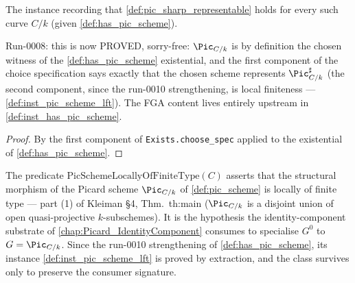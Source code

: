 \begin{definition}
  \label{def:inst_pic_sharp_representable}
  The instance recording that \cref{def:pic_sharp_representable} holds for
  every such curve \(C/k\) (given \cref{def:has_pic_scheme}).

  Run-0008: this is now PROVED, sorry-free: \(\Pic_{C/k}\) is by definition
  the chosen witness of the \cref{def:has_pic_scheme} existential, and the
  first component of the choice specification says exactly that the chosen
  scheme represents \(\Pic^\sharp_{C/k}\) (the second component, since the
  run-0010 strengthening, is local finiteness ---
  \cref{def:inst_pic_scheme_lft}). The FGA content lives entirely upstream
  in \cref{def:inst_has_pic_scheme}.
\end{definition}

\begin{proof}\leanok
  By the first component of \texttt{Exists.choose\_spec} applied to the
  existential of \cref{def:has_pic_scheme}.
\end{proof}


\begin{definition}
  \label{def:pic_scheme_lft}
  The predicate \(\mathrm{PicSchemeLocallyOfFiniteType}(C)\) asserts that the
  structural morphism of the Picard scheme \(\Pic_{C/k}\) of
  \cref{def:pic_scheme} is locally of finite type --- part (1) of Kleiman
  \S 4, Thm.~th:main (\(\Pic_{C/k}\) is a disjoint union of open
  quasi-projective \(k\)-subschemes). It is the hypothesis the
  identity-component substrate of
  \cref{chap:Picard_IdentityComponent} consumes to specialise
  \(G^0\) to \(G = \Pic_{C/k}\). Since the run-0010 strengthening of
  \cref{def:has_pic_scheme}, its instance \cref{def:inst_pic_scheme_lft}
  is proved by extraction, and the class survives only to preserve the
  consumer signature.
\end{definition}

